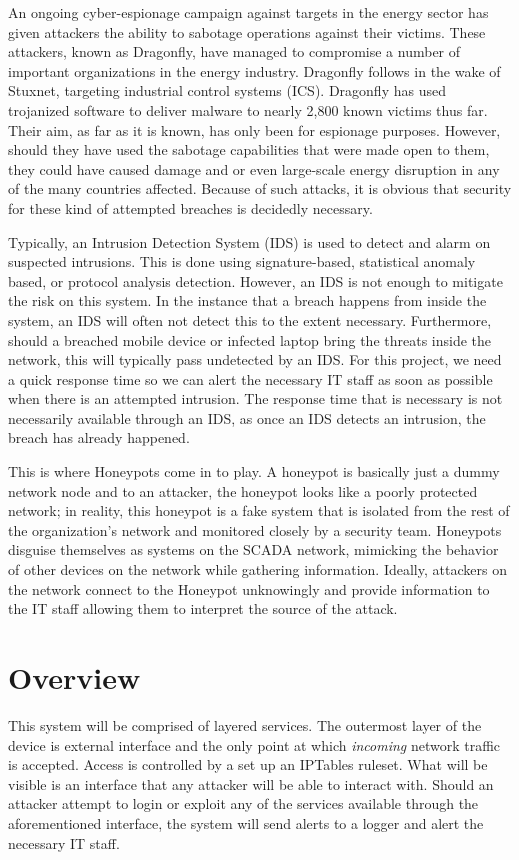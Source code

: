 An ongoing cyber-espionage campaign against targets in the energy sector has given attackers the ability to sabotage operations against their victims. These attackers, known as Dragonfly, have managed to compromise a number of important organizations in the energy industry. Dragonfly follows in the wake of Stuxnet, targeting industrial control systems (ICS). Dragonfly has used trojanized software to deliver malware to nearly 2,800 known victims thus far. Their aim, as far as it is known, has only been for espionage purposes. However, should they have used the sabotage capabilities that were made open to them, they could have caused damage and or even large-scale energy disruption in any of the many countries affected. Because of such attacks, it is obvious that security for these kind of attempted breaches is decidedly necessary. 

Typically, an Intrusion Detection System (IDS) is used to detect and alarm on suspected intrusions. This is done using signature-based, statistical anomaly based, or protocol analysis detection. However, an IDS is not enough to mitigate the risk on this system. In the instance that a breach happens from inside the system, an IDS will often not detect this to the extent necessary. Furthermore, should a breached mobile device or infected laptop bring the threats inside the network, this will typically pass undetected by an IDS. For this project, we need a quick response time so we can alert the necessary IT staff as soon as possible when there is an attempted intrusion. The response time that is necessary is not necessarily available through an IDS, as once an IDS detects an intrusion, the breach has already happened.

This is where Honeypots come in to play. A honeypot is basically just a dummy network node and to an attacker, the honeypot looks like a poorly protected network; in reality, this honeypot is a fake system that is isolated from the rest of the organization’s network and monitored closely by a security team. Honeypots disguise themselves as systems on the SCADA network, mimicking the behavior of other devices on the network while gathering information. Ideally, attackers on the network connect to the Honeypot unknowingly and provide information to the IT staff allowing them to interpret the source of the attack.

\section{Overview}
This system will be comprised of layered services. The outermost layer of the device is external interface and the only point at which \textit{incoming} network traffic is accepted. Access is controlled by a set up an IPTables ruleset. What will be visible is an interface that any attacker will be able to interact with. Should an attacker attempt to login or exploit any of the services available through the aforementioned interface, the system will send alerts to a logger and alert the necessary IT staff.

